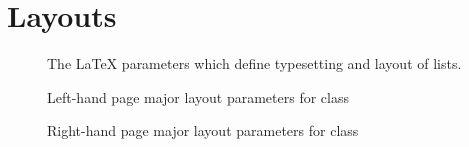 \chapter{Layouts}

\begin{figure}
\listdiagram
\caption{The \LaTeX{} parameters which define typesetting and layout of lists.} 
\label{fig:layout-list}
\end{figure}





\begin{figure}
\oddpagelayoutfalse
\twocolumnlayoutfalse
\stockdiagram
\caption{Left-hand page major layout parameters for  class}
\label{fig:layout-left-memoir}
\end{figure}

\begin{figure}
\oddpagelayouttrue
\twocolumnlayoutfalse
\stockdiagram
\caption{Right-hand page major layout parameters for  class}
\label{fig:layout-right-memoir}
\end{figure}
